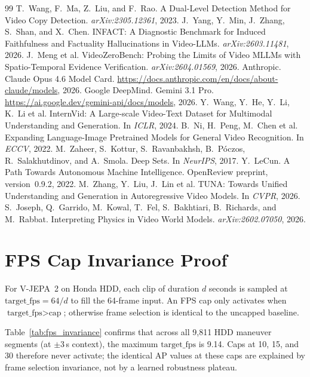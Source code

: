 \documentclass{article}
\theoremstyle{remark}
\begin{document}
\begin{thebibliography}{99}
 T.~Wang, F.~Ma, Z.~Liu, and F.~Rao. A Dual-Level Detection Method for Video Copy Detection. \emph{arXiv:2305.12361}, 2023.
 J.~Yang, Y.~Min, J.~Zhang, S.~Shan, and X.~Chen. INFACT: A Diagnostic Benchmark for Induced Faithfulness and Factuality Hallucinations in Video-LLMs. \emph{arXiv:2603.11481}, 2026.
 J.~Meng et al. VideoZeroBench: Probing the Limits of Video MLLMs with Spatio-Temporal Evidence Verification. \emph{arXiv:2604.01569}, 2026.
 Anthropic. Claude Opus 4.6 Model Card. \url{https://docs.anthropic.com/en/docs/about-claude/models}, 2026.
 Google DeepMind. Gemini 3.1 Pro. \url{https://ai.google.dev/gemini-api/docs/models}, 2026.
 Y.~Wang, Y.~He, Y.~Li, K.~Li et al. InternVid: A Large-scale Video-Text Dataset for Multimodal Understanding and Generation. In \emph{ICLR}, 2024.
 B.~Ni, H.~Peng, M.~Chen et al. Expanding Language-Image Pretrained Models for General Video Recognition. In \emph{ECCV}, 2022.
 M.~Zaheer, S.~Kottur, S.~Ravanbakhsh, B.~P\'{o}czos, R.~Salakhutdinov, and A.~Smola. Deep Sets. In \emph{NeurIPS}, 2017.
 Y.~LeCun. A Path Towards Autonomous Machine Intelligence. OpenReview preprint, version~0.9.2, 2022.
 M.~Zhang, Y.~Liu, J.~Lin et al. TUNA: Towards Unified Understanding and Generation in Autoregressive Video Models. In \emph{CVPR}, 2026.
 S.~Joseph, Q.~Garrido, M.~Kowal, T.~Fel, S.~Bakhtiari, B.~Richards, and M.~Rabbat. Interpreting Physics in Video World Models. \emph{arXiv:2602.07050}, 2026.
\end{thebibliography}

\newpage


\appendix

\section{FPS Cap Invariance Proof}
\label{sec:fps_invariance}

For V-JEPA~2 on Honda HDD, each clip of duration $d$ seconds is sampled at $\text{target\_fps} = 64 / d$ to fill the 64-frame input. An FPS cap only activates when $\text{target\_fps} > \text{cap}$; otherwise frame selection is identical to the uncapped baseline.

Table~\ref{tab:fps_invariance} confirms that across all 9{,}811 HDD maneuver segments (at $\pm$3\,s context), the maximum $\text{target\_fps}$ is 9.14. Caps at 10, 15, and 30 therefore never activate; the identical AP values at these caps are explained by frame selection invariance, not by a learned robustness plateau.
\end{document}
